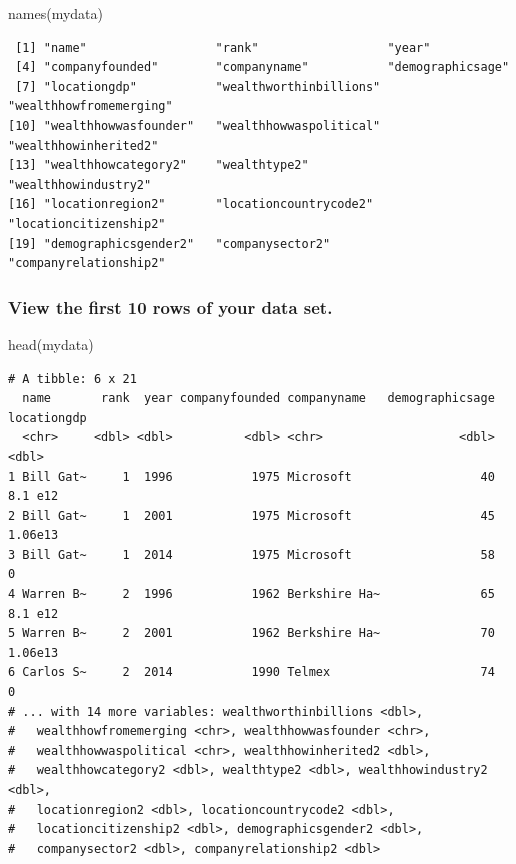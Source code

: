 \documentclass[
]{book}
\newenvironment{Shaded}{\begin{snugshade}}{\end{snugshade}}
\newcommand{\FunctionTok}[1]{\textcolor[rgb]{0.00,0.00,0.00}{#1}}
\newcommand{\NormalTok}[1]{#1}
\begin{document}
\begin{Shaded}
\begin{Highlighting}[]
\FunctionTok{names}\NormalTok{(mydata)}
\end{Highlighting}
\end{Shaded}

\begin{verbatim}
 [1] "name"                  "rank"                  "year"                 
 [4] "companyfounded"        "companyname"           "demographicsage"      
 [7] "locationgdp"           "wealthworthinbillions" "wealthhowfromemerging"
[10] "wealthhowwasfounder"   "wealthhowwaspolitical" "wealthhowinherited2"  
[13] "wealthhowcategory2"    "wealthtype2"           "wealthhowindustry2"   
[16] "locationregion2"       "locationcountrycode2"  "locationcitizenship2" 
[19] "demographicsgender2"   "companysector2"        "companyrelationship2" 
\end{verbatim}

\hypertarget{head}{%
\subsubsection*{View the first 10 rows of your data set.}\label{head}}

\begin{Shaded}
\begin{Highlighting}[]
\FunctionTok{head}\NormalTok{(mydata)}
\end{Highlighting}
\end{Shaded}

\begin{verbatim}
# A tibble: 6 x 21
  name       rank  year companyfounded companyname   demographicsage locationgdp
  <chr>     <dbl> <dbl>          <dbl> <chr>                   <dbl>       <dbl>
1 Bill Gat~     1  1996           1975 Microsoft                  40     8.1 e12
2 Bill Gat~     1  2001           1975 Microsoft                  45     1.06e13
3 Bill Gat~     1  2014           1975 Microsoft                  58     0      
4 Warren B~     2  1996           1962 Berkshire Ha~              65     8.1 e12
5 Warren B~     2  2001           1962 Berkshire Ha~              70     1.06e13
6 Carlos S~     2  2014           1990 Telmex                     74     0      
# ... with 14 more variables: wealthworthinbillions <dbl>,
#   wealthhowfromemerging <chr>, wealthhowwasfounder <chr>,
#   wealthhowwaspolitical <chr>, wealthhowinherited2 <dbl>,
#   wealthhowcategory2 <dbl>, wealthtype2 <dbl>, wealthhowindustry2 <dbl>,
#   locationregion2 <dbl>, locationcountrycode2 <dbl>,
#   locationcitizenship2 <dbl>, demographicsgender2 <dbl>,
#   companysector2 <dbl>, companyrelationship2 <dbl>
\end{verbatim}
\end{document}
